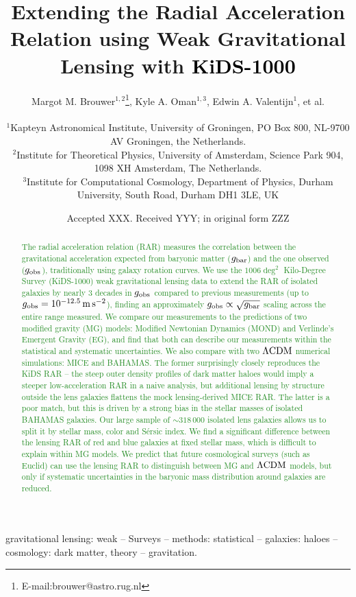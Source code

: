 \documentclass[usenatbib]{mnras}
\title[Extending the RAR using weak lensing with KiDS-1000]{Extending the Radial Acceleration Relation using Weak Gravitational Lensing with \textcolor{black}{KiDS-1000}}
\author[M. M. Brouwer et al.]{Margot M. Brouwer$^{1,2}$\thanks{E-mail:brouwer@astro.rug.nl}, Kyle A. Oman$^{1,3}$, Edwin A. Valentijn$^{1}$, et al.
	\\
	\\
	$^{1}$Kapteyn Astronomical Institute, University of Groningen, PO Box 800, NL-9700 AV Groningen, the Netherlands.\\
	$^{2}$Institute for Theoretical Physics, University of Amsterdam, Science Park 904, 1098 XH Amsterdam, The Netherlands. \\
    $^{3}$Institute for Computational Cosmology, Department of Physics, Durham University, South Road, Durham DH1 3LE, UK \\
}
\date{Accepted XXX. Received YYY; in original form ZZZ}
\newcommand{\lcdm}{{\rm \Lambda CDM}}
\newcommand{\un}[1]{_{\rm #1}}
\begin{document}
\label{firstpage}
\pagerange{\pageref{firstpage}--\pageref{lastpage}}
\maketitle

\begin{abstract}
  \textcolor{ForestGreen}{The radial acceleration relation (RAR) measures the correlation between the gravitational acceleration expected from baryonic matter ($g\un{bar}$) and the one observed ($g\un{obs}$), traditionally using galaxy rotation curves. We use the $1006 \deg^2$ Kilo-Degree Survey (KiDS-1000) weak gravitational lensing data to extend the RAR of isolated galaxies by nearly $3$ decades in $g_{\rm obs}$ compared to previous measurements (up to $g\un{obs}=10^{-12.5}\,{\rm m}\,{\rm s}^{-2}$), finding an approximately $g\un{obs}\propto\sqrt{g\un{bar}}$ scaling across the entire range measured. We compare our measurements to the predictions of two modified gravity (MG) models: Modified Newtonian Dynamics (MOND) and Verlinde's Emergent Gravity (EG), and find that both can describe our measurements within the statistical and systematic uncertainties. We also compare with two $\lcdm$ numerical simulations: MICE and BAHAMAS. The former surprisingly closely reproduces the KiDS RAR -- the steep outer density profiles of dark matter haloes would imply a steeper low-acceleration RAR in a naive analysis, but additional lensing by structure outside the lens galaxies flattens the mock lensing-derived MICE RAR. The latter is a poor match, but this is driven by a strong bias in the stellar masses of isolated BAHAMAS galaxies. Our large sample of $\sim318\,000$ isolated lens galaxies allows us to split it by stellar mass, color and S\'ersic index. We find a significant difference between the lensing RAR of red and blue galaxies at fixed stellar mass, which is difficult to explain within MG models. We predict that future cosmological surveys (such as Euclid) can use the lensing RAR to distinguish between MG and $\lcdm$ models, but only if systematic uncertainties in the baryonic mass distribution around galaxies are reduced.}
\end{abstract}


\begin{keywords}
gravitational lensing: weak -- Surveys -- methods: statistical -- galaxies: haloes -- cosmology: dark matter, theory -- gravitation.
\\
\end{keywords}
\end{document}
